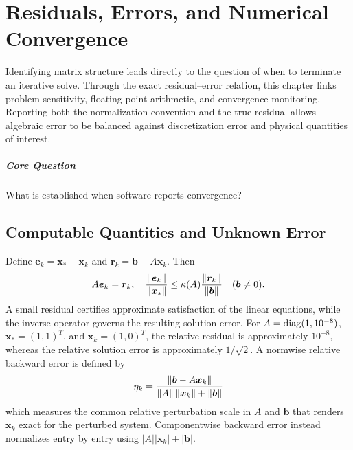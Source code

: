 \chapter{Residuals, Errors, and Numerical Convergence}\label{v0ch:3}
\begin{chaptersummary}
Identifying matrix structure leads directly to the question of when to terminate an iterative solve. Through the exact residual--error relation, this chapter links problem sensitivity, floating-point arithmetic, and convergence monitoring. Reporting both the normalization convention and the true residual allows algebraic error to be balanced against discretization error and physical quantities of interest.
\end{chaptersummary}
\paragraph{Core Question}What is established when software reports convergence?

\section{Computable Quantities and Unknown Error}
Define $\bm e_k=\bm x_*-\bm x_k$ and $\bm r_k=\bm b-A\bm x_k$. Then
\[
 A\bm e_k=\bm r_k,\quad
 \frac{\left\lVert \bm e_k\right\rVert}{\left\lVert \bm x_*\right\rVert}
 \le \kappa(A)\frac{\left\lVert \bm r_k\right\rVert}{\left\lVert \bm b\right\rVert}\quad(\bm b\ne0).
\]
A small residual certifies approximate satisfaction of the linear equations, while the inverse operator governs the resulting solution error. For $A=\operatorname{diag}(1,10^{-8})$, $\bm x_*=(1,1)^T$, and $\bm x_k=(1,0)^T$, the relative residual is approximately $10^{-8}$, whereas the relative solution error is approximately $1/\sqrt2$.
A normwise relative backward error is defined by
\[
 \eta_k=\frac{\left\lVert \bm b-A\bm x_k\right\rVert}
 {\left\lVert A\right\rVert\left\lVert \bm x_k\right\rVert+\left\lVert \bm b\right\rVert}
\]
which measures the common relative perturbation scale in $A$ and $\bm b$ that renders $\bm x_k$ exact for the perturbed system. Componentwise backward error instead normalizes entry by entry using $|A||\bm x_k|+|\bm b|$.
